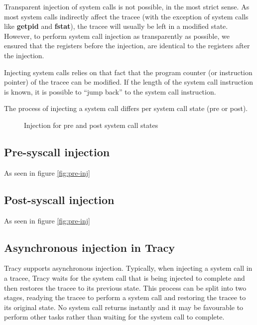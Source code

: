 \documentclass[a4paper, 10pt]{report}
\begin{document}
Transparent injection of system calls is not possible, in the most strict sense.
As most system calls indirectly affect the tracee (with the exception of system
calls like \textbf{getpid} and \textbf{fstat}), the tracee will usually
be left in a modified state. However, to perform system call injection as
transparently as possible, we ensured that the registers before the injection,
are identical to the registers after the injection.

Injecting system calls relies on that fact that the program counter (or
instruction pointer) of the tracee can be modified. If the length of the system
call instruction is known, it is possible to ``jump back'' to the system call
instruction. %

The process of injecting a system call differs per system call state (pre or
post).

\begin{figure}
    \centering
    \hspace{1em}
    \caption{Injection for pre and post system call states}
    \label{fig:injection}
\end{figure}


\subsection{Pre-syscall injection}

As seen in figure \ref{fig:pre-inj}

\subsection{Post-syscall injection}

As seen in figure \ref{fig:pre-inj}


\subsection{Asynchronous injection in Tracy}

Tracy supports asynchronous injection. Typically, when injecting a system call
in a tracee, Tracy waits for the system call that is being injected to complete
and then restores the tracee to its previous state. This process can be split
into two stages, readying the tracee to perform a system call and restoring
the tracee to its original state. No system call returns instantly and it
may be favourable to perform other tasks rather than waiting for the system
call to complete.
\end{document}
